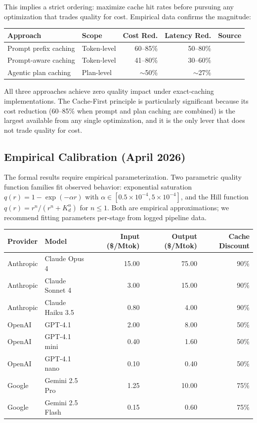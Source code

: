 This implies a strict ordering: maximize cache hit rates before pursuing any optimization that trades quality for cost. Empirical data confirms the magnitude:

\begin{center}
\small
\begin{tabular}{llrrl}
\toprule
\textbf{Approach} & \textbf{Scope} & \textbf{Cost Red.} & \textbf{Latency Red.} & \textbf{Source} \\
\midrule
Prompt prefix caching & Token-level & 60--85\% & 50--80\% & \citep{anthropic2026coding} \\
Prompt-aware caching & Token-level & 41--80\% & 30--60\% & \citep{liang2026cache} \\
Agentic plan caching & Plan-level & $\sim$50\% & $\sim$27\% & \citep{zhang2025plancache} \\
\bottomrule
\end{tabular}
\end{center}

All three approaches achieve zero quality impact under exact-caching implementations. The Cache-First principle is particularly significant because its cost reduction (60--85\% when prompt and plan caching are combined) is the largest available from any single optimization, and it is the only lever that does not trade quality for cost.

\subsection{Empirical Calibration (April 2026)}

The formal results require empirical parameterization. Two parametric quality function families fit observed behavior: exponential saturation $q(r) = 1 - \exp(-\alpha r)$ with $\alpha \in [0.5 \times 10^{-4}, 5 \times 10^{-4}]$, and the Hill function $q(r) = r^n / (r^n + K_d^n)$ for $n \leq 1$. Both are empirical approximations; we recommend fitting parameters per-stage from logged pipeline data.

\begin{center}
\small
\begin{tabular}{llrrr}
\toprule
\textbf{Provider} & \textbf{Model} & \textbf{Input (\$/Mtok)} & \textbf{Output (\$/Mtok)} & \textbf{Cache Discount} \\
\midrule
Anthropic & Claude Opus 4 & 15.00 & 75.00 & 90\% \\
Anthropic & Claude Sonnet 4 & 3.00 & 15.00 & 90\% \\
Anthropic & Claude Haiku 3.5 & 0.80 & 4.00 & 90\% \\
\hdashline
OpenAI & GPT-4.1 & 2.00 & 8.00 & 50\% \\
OpenAI & GPT-4.1 mini & 0.40 & 1.60 & 50\% \\
OpenAI & GPT-4.1 nano & 0.10 & 0.40 & 50\% \\
\hdashline
Google & Gemini 2.5 Pro & 1.25 & 10.00 & 75\% \\
Google & Gemini 2.5 Flash & 0.15 & 0.60 & 75\% \\
\bottomrule
\end{tabular}
\end{center}

